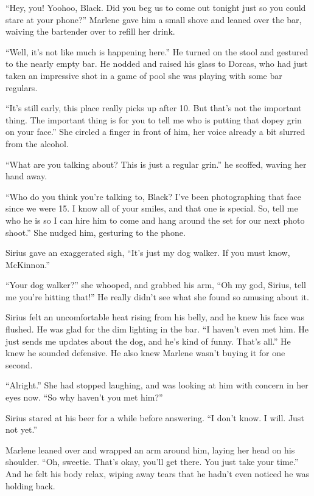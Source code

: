 \documentclass[12pt,twoside,openright]{memoir}
\begin{document}
``Hey, you! Yoohoo, Black. Did you beg us to come out tonight just so you could stare at your phone?'' Marlene gave him a small shove and leaned over the bar, waiving the bartender over to refill her drink. 

``Well, it's not like much is happening here.'' He turned on the stool and gestured to the nearly empty bar. He nodded and raised his glass to Dorcas, who had just taken an impressive shot in a game of pool she was playing with some bar regulars.

``It's still early, this place really picks up after 10. But that's not the important thing. The important thing is for you to tell me who is putting that dopey grin on your face.'' She circled a finger in front of him, her voice already a bit slurred from the alcohol.

``What are you talking about? This is just a regular grin.'' he scoffed, waving her hand away. 

``Who do you think you're talking to, Black? I've been photographing that face since we were 15. I know all of your smiles, and that one is special. So, tell me who he is so I can hire him to come and hang around the set for our next photo shoot.'' She nudged him, gesturing to the phone.

Sirius gave an exaggerated sigh, ``It's just my dog walker. If you must know, McKinnon.''

``Your dog walker?'' she whooped, and grabbed his arm, ``Oh my god, Sirius, tell me you're hitting that!'' He really didn't see what she found so amusing about it.

Sirius felt an uncomfortable heat rising from his belly, and he knew his face was flushed. He was glad for the dim lighting in the bar. ``I haven't even met him. He just sends me updates about the dog, and he's kind of funny. That's all.'' He knew he sounded defensive. He also knew Marlene wasn't buying it for one second. 

``Alright.'' She had stopped laughing, and was looking at him with concern in her eyes now. ``So why haven't you met him?''

Sirius stared at his beer for a while before answering. ``I don't know. I will. Just not yet.''

Marlene leaned over and wrapped an arm around him, laying her head on his shoulder. ``Oh, sweetie. That's okay, you'll get there. You just take your time.'' And he felt his body relax, wiping away tears that he hadn't even noticed he was holding back.
\end{document}
